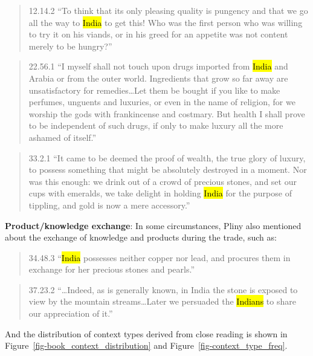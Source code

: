 \documentclass[
  12pt,
]{article}
\begin{document}
\begin{quote}
12.14.2 ``To think that its only pleasing quality is pungency and that
we go all the way to \hl{India} to get this! Who was the first person
who was willing to try it on his viands, or in his greed for an appetite
was not content merely to be hungry?''
\end{quote}

\begin{quote}
22.56.1 ``I myself shall not touch upon drugs imported from \hl{India}
and Arabia or from the outer world. Ingredients that grow so far away
are unsatisfactory for remedies\ldots Let them be bought if you like to
make perfumes, unguents and luxuries, or even in the name of religion,
for we worship the gods with frankincense and costmary. But health I
shall prove to be independent of such drugs, if only to make luxury all
the more ashamed of itself.''
\end{quote}

\begin{quote}
33.2.1 ``It came to be deemed the proof of wealth, the true glory of
luxury, to possess something that might be absolutely destroyed in a
moment. Nor was this enough: we drink out of a crowd of precious stones,
and set our cups with emeralds, we take delight in holding \hl{India}
for the purpose of tippling, and gold is now a mere accessory.''
\end{quote}

\textbf{Product/knowledge exchange}: In some circumstances, Pliny also
mentioned about the exchange of knowledge and products during the trade,
such as:

\begin{quote}
34.48.3 ``\hl{India} possesses neither copper nor lead, and procures
them in exchange for her precious stones and pearls.''
\end{quote}

\begin{quote}
37.23.2 ``\ldots Indeed, as is generally known, in India the stone is
exposed to view by the mountain streams\ldots Later we persuaded the
\hl{Indians} to share our appreciation of it.''
\end{quote}

And the distribution of context types derived from close reading is
shown in Figure~\ref{fig-book_context_distribution} and
Figure~\ref{fig-context_type_freq}.
\end{document}
